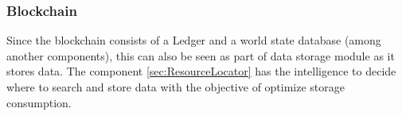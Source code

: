 \subsubsection{Blockchain}\label{sec:DataStorageBlockchain}

Since the blockchain consists of a Ledger and a world state database (among another components), this can also be seen as part of data storage module as it stores data. The component \ref{sec:ResourceLocator} has the intelligence to decide where to search and store data with the objective of optimize storage consumption.